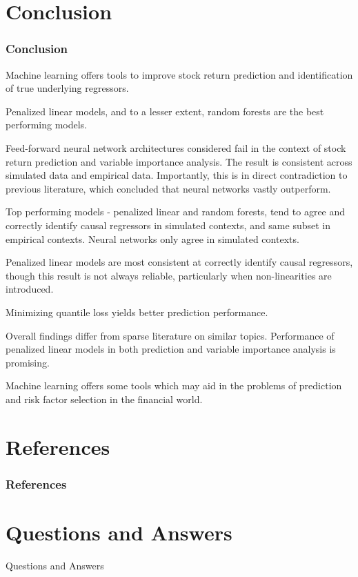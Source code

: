 \documentclass[aspectratio=169]{beamer}
\begin{document}
\section{Conclusion}
\begin{frame}
\frametitle{Conclusion}
Machine learning offers tools to improve stock return prediction and identification of true underlying regressors. 

Penalized linear models, and to a lesser extent, random forests are the best performing models.

Feed-forward neural network architectures considered fail in the context of stock return prediction and variable importance analysis. The result is consistent across simulated data and empirical data. Importantly, this is in direct contradiction to previous literature, which concluded that neural networks vastly outperform. 

Top performing models - penalized linear and random forests, tend to agree and correctly identify causal regressors in simulated contexts, and same subset in empirical contexts. Neural networks only agree in simulated contexts. 

Penalized linear models are most consistent at correctly identify causal regressors, though this result is not always reliable, particularly when non-linearities are introduced.

Minimizing quantile loss yields better prediction performance.

Overall findings differ from sparse literature on similar topics. Performance of penalized linear models in both prediction and variable importance analysis is promising. 

Machine learning offers some tools which may aid in the problems of prediction and risk factor selection in the financial world.
\end{frame}

\section{References}
\begin{frame}
\frametitle{References}


\end{frame}

\section{Questions and Answers}

\begin{frame}
\begin{center}
\huge Questions and Answers
\end{center}
\end{frame}
\end{document}
